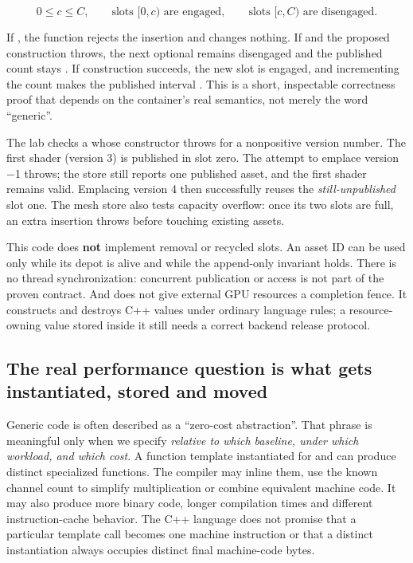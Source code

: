 \[
0\le c\le C,\qquad
\text{slots }[0,c)\text{ are engaged},\qquad
\text{slots }[c,C)\text{ are disengaged}.
\]

If , the function rejects the insertion and changes nothing. If  and the proposed construction throws, the next optional remains disengaged and the published count stays . If construction succeeds, the new slot is engaged, and incrementing the count makes the published interval \BookInlineCode{{[}0,c+1)}. This is a short, inspectable correctness proof that depends on the container's real semantics, not merely the word ``generic''.

The lab checks a  whose constructor throws for a nonpositive version number. The first shader (version 3) is published in slot zero. The attempt to emplace version −1 throws; the store still reports one published asset, and the first shader remains valid. Emplacing version 4 then successfully reuses the \emph{still-unpublished} slot one. The mesh store also tests capacity overflow: once its two slots are full, an extra insertion throws before touching existing assets.

This code does \textbf{not} implement removal or recycled slots. An asset ID can be used only while its depot is alive and while the append-only invariant holds. There is no thread synchronization: concurrent publication or access is not part of the proven contract. And  does not give external GPU resources a completion fence. It constructs and destroys C++ values under ordinary language rules; a resource-owning value stored inside it still needs a correct backend release protocol.

\subsection{The real performance question is what gets instantiated, stored and moved}\label{05-engine-i-ch005-the-real-performance-question-is-what-gets-instantiated-stored-and-moved}

\hypertarget{05-engine-i-ch005-the-real-performance-question-is-what-gets-instantiated-stored-and-moved}{}

Generic code is often described as a ``zero-cost abstraction''. That phrase is meaningful only when we specify \emph{relative to which baseline, under which workload, and which cost}. A function template instantiated for  and  can produce distinct specialized functions. The compiler may inline them, use the known channel count to simplify multiplication or combine equivalent machine code. It may also produce more binary code, longer compilation times and different instruction-cache behavior. The C++ language does not promise that a particular template call becomes one machine instruction or that a distinct instantiation always occupies distinct final machine-code bytes.

